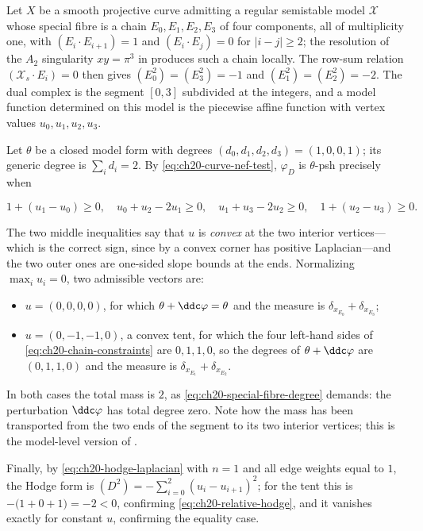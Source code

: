 \begin{example}
\label{ex:ch20-chain-three}
Let $X$ be a smooth projective curve admitting a regular semistable model
$\mathcal X$ whose special fibre is a chain
$E_0,E_1,E_2,E_3$ of four components, all of multiplicity one, with
$(E_{i}\cdot E_{i+1})=1$ and $(E_i\cdot E_j)=0$ for $|i-j|\geq2$; the
resolution of the $A_2$ singularity $xy=\pi^3$ in
 produces such a chain locally.  The row-sum relation
$(\mathcal X_s\cdot E_i)=0$ then gives $(E_0^2)=(E_3^2)=-1$ and
$(E_1^2)=(E_2^2)=-2$.  The dual complex is the segment $[0,3]$
subdivided at the integers, and a model function determined on this model is
the piecewise affine function with vertex values $u_0,u_1,u_2,u_3$.

Let $\theta$ be a closed model form with degrees
$(d_0,d_1,d_2,d_3)=(1,0,0,1)$; its generic degree is
$\sum_id_i=2$.  By \eqref{eq:ch20-curve-nef-test}, $\varphi_D$ is
$\theta$-psh precisely when

\begin{equation}
\label{eq:ch20-chain-constraints}
 1+(u_1-u_0)\geq0,\quad
 u_0+u_2-2u_1\geq0,\quad
 u_1+u_3-2u_2\geq0,\quad
 1+(u_2-u_3)\geq0 .
\end{equation}

The two middle inequalities say that $u$ is \emph{convex} at the two
interior vertices---which is the correct sign, since by
 a convex corner has positive
Laplacian---and the two outer ones are one-sided slope bounds at the ends.
Normalizing $\max_iu_i=0$, two admissible vectors are:

\begin{itemize}
\item $u=(0,0,0,0)$, for which $\theta+\ddc\varphi=\theta$ and the
 measure is $\delta_{x_{E_0}}+\delta_{x_{E_3}}$;
\item $u=(0,-1,-1,0)$, a convex tent, for which the four left-hand sides of
 \eqref{eq:ch20-chain-constraints} are $0,1,1,0$, so the degrees of
 $\theta+\ddc\varphi$ are $(0,1,1,0)$ and the measure is
 $\delta_{x_{E_1}}+\delta_{x_{E_2}}$.
\end{itemize}

In both cases the total mass is $2$, as
\eqref{eq:ch20-special-fibre-degree} demands: the perturbation
$\ddc\varphi$ has total degree zero.  Note how the mass has been
transported from the two ends of the segment to its two interior vertices;
this is the model-level version of .

Finally, by \eqref{eq:ch20-hodge-laplacian} with $n=1$ and all edge
weights equal to $1$, the Hodge form is
$(D^2)=-\sum_{i=0}^{2}(u_i-u_{i+1})^2$; for the tent this is
$-\bigl(1+0+1\bigr)=-2<0$, confirming
\eqref{eq:ch20-relative-hodge}, and it vanishes exactly for constant $u$,
confirming the equality case.
\end{example}

